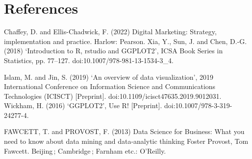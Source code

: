 \documentclass[12pt]{article}
\begin{document}
\section{References}
 Chaffey, D. and Ellis-Chadwick, F. (2022) Digital Marketing: Strategy, implementation and practice. Harlow: Pearson. 
  Xia, Y., Sun, J. and Chen, D.-G. (2018) ‘Introduction to R, rstudio and GGPLOT2’, ICSA Book Series in Statistics, pp. 77–127. doi:10.1007/978-981-13-1534-3_4.
  
  Islam, M. and Jin, S. (2019) ‘An overview of data visualization’, 2019 International Conference on Information Science and Communications Technologies (ICISCT) [Preprint]. doi:10.1109/icisct47635.2019.9012031.
  Wickham, H. (2016) ‘GGPLOT2’, Use R! [Preprint]. doi:10.1007/978-3-319-24277-4. 
  
 
 


 
  


 

 \FloatBarrier


\FloatBarrier
FAWCETT, T. and PROVOST, F. (2013) Data Science for Business: What you need to know about data mining and data-analytic thinking Foster Provost, Tom Fawcett. Beijing ; Cambridge ; Farnham etc.: O’Reilly. 
\end{document}
